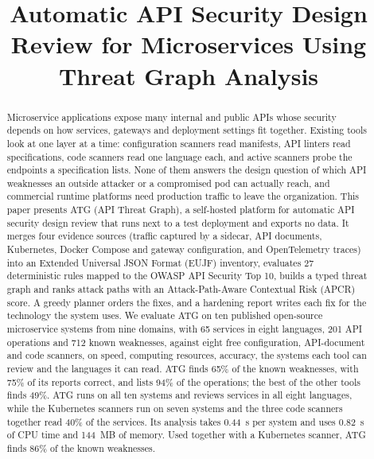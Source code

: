 \documentclass[conference]{IEEEtran}
\begin{document}
\title{Automatic API Security Design Review for Microservices Using Threat Graph Analysis}

\author{
}

\maketitle

\begin{abstract}
Microservice applications expose many internal and public APIs whose security depends on how services, gateways and deployment settings fit together. Existing tools look at one layer at a time: configuration scanners read manifests, API linters read specifications, code scanners read one language each, and active scanners probe the endpoints a specification lists. None of them answers the design question of which API weaknesses an outside attacker or a compromised pod can actually reach, and commercial runtime platforms need production traffic to leave the organization. This paper presents ATG (API Threat Graph), a self-hosted platform for automatic API security design review that runs next to a test deployment and exports no data. It merges four evidence sources (traffic captured by a sidecar, API documents, Kubernetes, Docker Compose and gateway configuration, and OpenTelemetry traces) into an Extended Universal JSON Format (EUJF) inventory, evaluates 27 deterministic rules mapped to the OWASP API Security Top 10, builds a typed threat graph and ranks attack paths with an Attack-Path-Aware Contextual Risk (APCR) score. A greedy planner orders the fixes, and a hardening report writes each fix for the technology the system uses. We evaluate ATG on ten published open-source microservice systems from nine domains, with 65 services in eight languages, 201 API operations and 712 known weaknesses, against eight free configuration, API-document and code scanners, on speed, computing resources, accuracy, the systems each tool can review and the languages it can read. ATG finds 65\% of the known weaknesses, with 75\% of its reports correct, and lists 94\% of the operations; the best of the other tools finds 49\%. ATG runs on all ten systems and reviews services in all eight languages, while the Kubernetes scanners run on seven systems and the three code scanners together read 40\% of the services. Its analysis takes 0.44~s per system and uses 0.82~s of CPU time and 144~MB of memory. Used together with a Kubernetes scanner, ATG finds 86\% of the known weaknesses.
\end{abstract}
\end{document}
